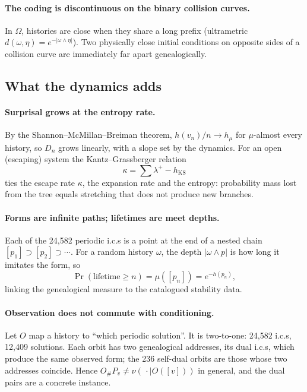 \documentclass[11pt]{article}
\theoremstyle{remark}
\begin{document}
\paragraph{The coding is discontinuous on the binary collision curves.} In $\Omega$, histories are close when
they share a long prefix (ultrametric $d(\omega,\eta)=e^{-|\omega\wedge\eta|}$). Two physically close
initial conditions on opposite sides of a collision curve are immediately far apart genealogically.

\subsection{What the dynamics adds}

\paragraph{Surprisal grows at the entropy rate.} By the Shannon--\allowbreak McMillan--\allowbreak Breiman
theorem,
$h(v_n)/n\to h_\mu$ for $\mu$-almost every history, so $D_n$ grows linearly, with a slope set by the
dynamics. For an open (escaping) system the Kantz--Grassberger relation \cite{KantzGrassberger1985}
\begin{equation}
  \kappa=\sum\lambda^+-h_{\mathrm{KS}}
\end{equation}
ties the escape rate $\kappa$, the expansion rate and the entropy: probability mass lost from the tree equals
stretching that does not produce new branches.

\paragraph{Forms are infinite paths; lifetimes are meet depths.} Each of the 24{,}582 periodic i.c.s is a
point at the end of a nested chain $[p_1]\supset[p_2]\supset\cdots$. For a random history $\omega$, the depth
$|\omega\wedge p|$ is how long it imitates the form, so
\begin{equation}
  \Pr(\text{lifetime}\ge n)=\mu([p_n])=e^{-h(p_n)},
\end{equation}
linking the genealogical measure to the catalogued stability data.

\paragraph{Observation does not commute with conditioning.} Let $O$ map a history to ``which periodic
solution''. It is two-to-one: 24{,}582 i.c.s, 12{,}409 solutions. Each orbit has two genealogical addresses,
its dual i.c.s, which produce the same observed form; the 236 self-dual orbits are those whose two addresses
coincide. Hence $O_\#P_v\neq\nu(\,\cdot\mid O([v]))$ in general, and the dual pairs are a concrete instance.
\end{document}
